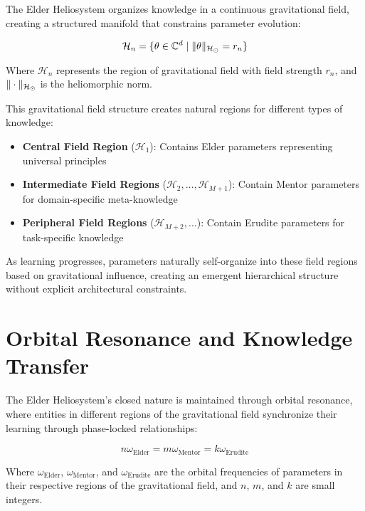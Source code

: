 The Elder Heliosystem organizes knowledge in a continuous gravitational field, creating a structured manifold that constrains parameter evolution:

\begin{equation}
\mathcal{H}_n = \{\theta \in \mathbb{C}^{d} \mid \|\theta\|_{\mathcal{H}_{\odot}} = r_n\}
\end{equation}

Where $\mathcal{H}_n$ represents the region of gravitational field with field strength $r_n$, and $\|\cdot\|_{\mathcal{H}_{\odot}}$ is the heliomorphic norm.

This gravitational field structure creates natural regions for different types of knowledge:

\begin{itemize}
    \item \textbf{Central Field Region} ($\mathcal{H}_1$): Contains Elder parameters representing universal principles
    \item \textbf{Intermediate Field Regions} ($\mathcal{H}_2, \ldots, \mathcal{H}_{M+1}$): Contain Mentor parameters for domain-specific meta-knowledge
    \item \textbf{Peripheral Field Regions} ($\mathcal{H}_{M+2}, \ldots$): Contain Erudite parameters for task-specific knowledge
\end{itemize}

As learning progresses, parameters naturally self-organize into these field regions based on gravitational influence, creating an emergent hierarchical structure without explicit architectural constraints.

\section{Orbital Resonance and Knowledge Transfer}

The Elder Heliosystem's closed nature is maintained through orbital resonance, where entities in different regions of the gravitational field synchronize their learning through phase-locked relationships:

\begin{equation}
n\omega_{\text{Elder}} = m\omega_{\text{Mentor}} = k\omega_{\text{Erudite}}
\end{equation}

Where $\omega_{\text{Elder}}$, $\omega_{\text{Mentor}}$, and $\omega_{\text{Erudite}}$ are the orbital frequencies of parameters in their respective regions of the gravitational field, and $n$, $m$, and $k$ are small integers.

